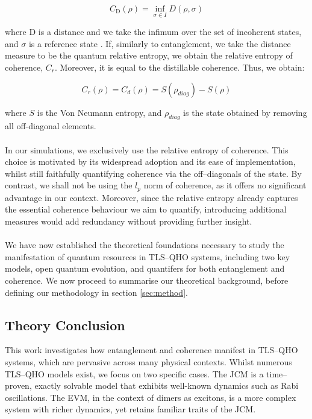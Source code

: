 \documentclass[11pt]{article}
\begin{document}
\begin{equation}
    C_{\scriptscriptstyle\text{D}}(\rho) = \inf_{\sigma \in I} D(\rho,\sigma)
\end{equation}

where D is a distance and we take the infimum over the set of incoherent states, and $\sigma$ is a reference state \cite{Coherence2017-Colloquium}. If, similarly to entanglement, we take the distance measure to be the quantum relative entropy, we obtain the relative entropy of coherence, $C_r$. Moreover, it is equal to the distillable coherence. Thus, we obtain:

\begin{equation} \label{rel_ent_coh}
C_r(\rho) = C_d(\rho) = S(\rho_{diag}) - S(\rho)
\end{equation}

where $S$ is the Von Neumann entropy, and $\rho_{diag}$ is the state obtained by removing all off-diagonal elements. \\
\\
In our simulations, we exclusively use the relative entropy of coherence. This choice is motivated by its widespread adoption and its ease of implementation, whilst still faithfully quantifying coherence via the off--diagonals of the state. By contrast, we shall not be using the $l_p$ norm of coherence, as it offers no significant advantage in our context. Moreover, since the relative entropy already captures the essential coherence behaviour we aim to quantify, introducing additional measures would add redundancy without providing further insight.\\
\\
We have now established the theoretical foundations necessary to study the manifestation of quantum resources in TLS--QHO systems, including two key models, open quantum evolution, and quantifers for both entanglement and coherence. We now proceed to summarise our theoretical background, before defining our methodology in section \ref{sec:method}.
\subsection{Theory Conclusion}

This work investigates how entanglement and coherence manifest in TLS--QHO systems, which are pervasive across many physical contexts. Whilst numerous TLS--QHO models exist, we focus on two specific cases. The JCM is a time--proven, exactly solvable model that exhibits well-known dynamics such as Rabi oscillations. The EVM, in the context of dimers as excitons, is a more complex system with richer dynamics, yet retains familiar traits of the JCM.
\end{document}
